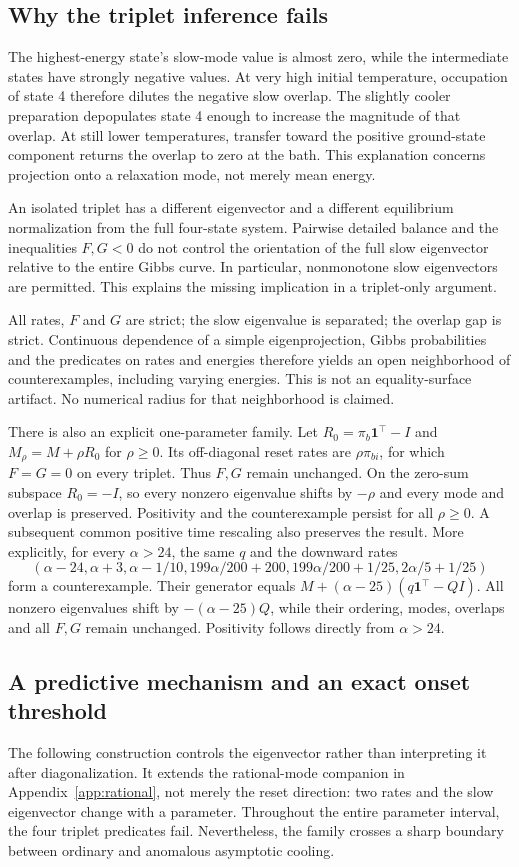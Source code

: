 \documentclass[11pt]{article}
\begin{document}
\subsection{Why the triplet inference fails}
The highest-energy state's slow-mode value is almost zero, while the intermediate states have strongly negative values. At very high initial temperature, occupation of state 4 therefore dilutes the negative slow overlap. The slightly cooler preparation depopulates state 4 enough to increase the magnitude of that overlap. At still lower temperatures, transfer toward the positive ground-state component returns the overlap to zero at the bath. This explanation concerns projection onto a relaxation mode, not merely mean energy.

An isolated triplet has a different eigenvector and a different equilibrium normalization from the full four-state system. Pairwise detailed balance and the inequalities $F,G<0$ do not control the orientation of the full slow eigenvector relative to the entire Gibbs curve. In particular, nonmonotone slow eigenvectors are permitted. This explains the missing implication in a triplet-only argument.

All rates, $F$ and $G$ are strict; the slow eigenvalue is separated; the overlap gap is strict. Continuous dependence of a simple eigenprojection, Gibbs probabilities and the predicates on rates and energies therefore yields an open neighborhood of counterexamples, including varying energies. This is not an equality-surface artifact. No numerical radius for that neighborhood is claimed.

There is also an explicit one-parameter family. Let $R_0=\pi_b\mathbf1^\top-I$ and $M_\rho=M+\rho R_0$ for $\rho\geq0$. Its off-diagonal reset rates are $\rho\pi_{bi}$, for which $F=G=0$ on every triplet. Thus $F,G$ remain unchanged. On the zero-sum subspace $R_0=-I$, so every nonzero eigenvalue shifts by $-\rho$ and every mode and overlap is preserved. Positivity and the counterexample persist for all $\rho\geq0$. A subsequent common positive time rescaling also preserves the result. More explicitly, for every $\alpha>24$, the same $q$ and the downward rates
\[
(\alpha-24,\alpha+3,\alpha-1/10,
199\alpha/200+200,199\alpha/200+1/25,2\alpha/5+1/25)
\]
form a counterexample. Their generator equals $M+(\alpha-25)(q\mathbf1^\top-QI)$. All nonzero eigenvalues shift by $-(\alpha-25)Q$, while their ordering, modes, overlaps and all $F,G$ remain unchanged. Positivity follows directly from $\alpha>24$.

\subsection{A predictive mechanism and an exact onset threshold}\label{sec:mechanism}
The following construction controls the eigenvector rather than interpreting it after diagonalization. It extends the rational-mode companion in Appendix~\ref{app:rational}, not merely the reset direction: two rates and the slow eigenvector change with a parameter. Throughout the entire parameter interval, the four triplet predicates fail. Nevertheless, the family crosses a sharp boundary between ordinary and anomalous asymptotic cooling.
\end{document}
